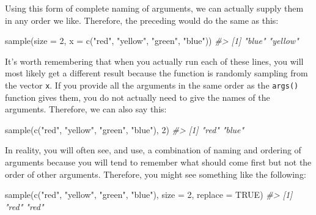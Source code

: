\documentclass[
]{book}
\newenvironment{Shaded}{\begin{snugshade}}{\end{snugshade}}
\newcommand{\AttributeTok}[1]{\textcolor[rgb]{0.77,0.63,0.00}{#1}}
\newcommand{\CommentTok}[1]{\textcolor[rgb]{0.56,0.35,0.01}{\textit{#1}}}
\newcommand{\ConstantTok}[1]{\textcolor[rgb]{0.00,0.00,0.00}{#1}}
\newcommand{\DecValTok}[1]{\textcolor[rgb]{0.00,0.00,0.81}{#1}}
\newcommand{\FunctionTok}[1]{\textcolor[rgb]{0.00,0.00,0.00}{#1}}
\newcommand{\NormalTok}[1]{#1}
\newcommand{\StringTok}[1]{\textcolor[rgb]{0.31,0.60,0.02}{#1}}
\begin{document}
Using this form of complete naming of arguments, we can actually supply them in any order we like. Therefore, the preceding would do the same as this:

\begin{Shaded}
\begin{Highlighting}[]
\FunctionTok{sample}\NormalTok{(}\AttributeTok{size =} \DecValTok{2}\NormalTok{, }\AttributeTok{x =} \FunctionTok{c}\NormalTok{(}\StringTok{"red"}\NormalTok{, }\StringTok{"yellow"}\NormalTok{, }\StringTok{"green"}\NormalTok{, }\StringTok{"blue"}\NormalTok{))}
\CommentTok{\#\textgreater{} [1] "blue"   "yellow"}
\end{Highlighting}
\end{Shaded}

It's worth remembering that when you actually run each of these lines, you will most likely get a different result because the function is randomly sampling from the vector \texttt{x}. If you provide all the arguments in the same order as the \texttt{args()} function gives them, you do not actually need to give the names of the arguments. Therefore, we can also say this:

\begin{Shaded}
\begin{Highlighting}[]
\FunctionTok{sample}\NormalTok{(}\FunctionTok{c}\NormalTok{(}\StringTok{"red"}\NormalTok{, }\StringTok{"yellow"}\NormalTok{, }\StringTok{"green"}\NormalTok{, }\StringTok{"blue"}\NormalTok{), }\DecValTok{2}\NormalTok{)}
\CommentTok{\#\textgreater{} [1] "red"  "blue"}
\end{Highlighting}
\end{Shaded}

In reality, you will often see, and use, a combination of naming and ordering of arguments because you will tend to remember what should come first but not the order of other arguments. Therefore, you might see something like the following:

\begin{Shaded}
\begin{Highlighting}[]
\FunctionTok{sample}\NormalTok{(}\FunctionTok{c}\NormalTok{(}\StringTok{"red"}\NormalTok{, }\StringTok{"yellow"}\NormalTok{, }\StringTok{"green"}\NormalTok{, }\StringTok{"blue"}\NormalTok{), }\AttributeTok{size =} \DecValTok{2}\NormalTok{, }\AttributeTok{replace =} \ConstantTok{TRUE}\NormalTok{)}
\CommentTok{\#\textgreater{} [1] "red" "red"}
\end{Highlighting}
\end{Shaded}
\end{document}
